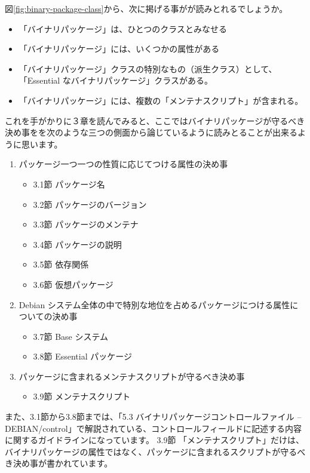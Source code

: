 \documentclass[mingoth,a4paper]{jsarticle}
\begin{document}
図\ref{fig:binary-package-class}から、次に掲げる事がが読みとれるでしょうか。
\begin{itemize}
\item 「バイナリパッケージ」は、ひとつのクラスとみなせる
\item 「バイナリパッケージ」には、いくつかの属性がある
\item 「バイナリパッケージ」クラスの特別なもの（派生クラス）として、「Essential なバイナリパッケージ」クラスがある。
\item 「バイナリパッケージ」には、複数の「メンテナスクリプト」が含まれる。
\end{itemize}

これを手がかりに３章を読んでみると、ここではバイナリパッケージが守るべき決め事をを次のような三つの側面から論じているように読みとることが出来るように思います。
\begin{enumerate}
\item パッケージ一つ一つの性質に応じてつける属性の決め事
\begin{itemize}
\item 3.1節 パッケージ名
\item 3.2節 パッケージのバージョン
\item 3.3節 パッケージのメンテナ
\item 3.4節 パッケージの説明
\item 3.5節 依存関係
\item 3.6節 仮想パッケージ
\end{itemize}
\item Debian システム全体の中で特別な地位を占めるパッケージにつける属性についての決め事
\begin{itemize}
\item 3.7節 Base システム
\item 3.8節 Essential パッケージ
\end{itemize}
\item パッケージに含まれるメンテナスクリプトが守るべき決め事
\begin{itemize}
\item 3.9節 メンテナスクリプト
\end{itemize}
\end{enumerate}

また、3.1節から3.8節までは、「5.3 バイナリパッケージコントロールファイル -- DEBIAN/control」で解説されている、コントロールフィールドに記述する内容に関するガイドラインになっています。
3.9節 「メンテナスクリプト」だけは、バイナリパッケージの属性ではなく、パッケージに含まれるスクリプトが守るべき決め事が書かれています。
\end{document}
